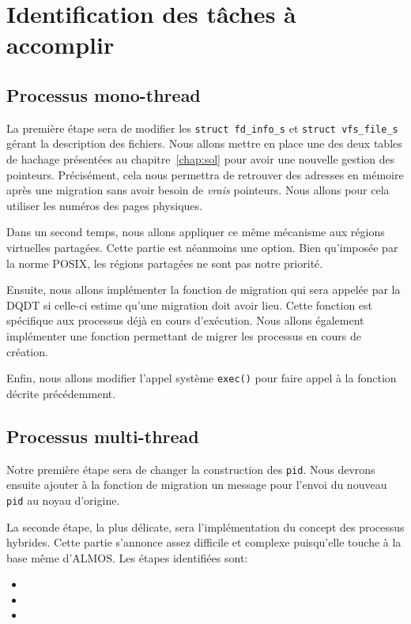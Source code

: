 \chapter{Identification des tâches à accomplir}
\label{chap:tasks}

  \section{Processus mono-thread}

    La première étape sera de modifier les \texttt{struct fd\_info\_s} et
    \texttt{struct vfs\_file\_s} gérant la description des fichiers. Nous allons
    mettre en place une des deux tables de hachage présentées au
    chapitre~\ref{chap:sol} pour avoir une nouvelle gestion des
    pointeurs. Précisément, cela nous permettra de retrouver des adresses en
    mémoire après une migration sans avoir besoin de \textit{vrais}
    pointeurs. Nous allons pour cela utiliser les numéros des pages physiques.

    Dans un second temps, nous allons appliquer ce même mécanisme aux régions
    virtuelles partagées. Cette partie est néanmoins une option. Bien qu'imposée
    par la norme POSIX, les régions partagées ne sont pas notre priorité.

    Ensuite, nous allons implémenter la fonction de migration qui sera appelée
    par la DQDT si celle-ci estime qu'une migration doit avoir lieu. Cette
    fonction est spécifique aux processus déjà en cours d'exécution. Nous allons
    également implémenter une fonction permettant de migrer les processus en
    cours de création.
    
    Enfin, nous allons modifier l'appel système \texttt{exec()} pour faire appel
    à la fonction décrite précédemment.
    
  \section{Processus multi-thread}

    Notre première étape sera de changer la construction des \texttt{pid}. Nous
    devrons ensuite ajouter à la fonction de migration un message pour l'envoi
    du nouveau \texttt{pid} au noyau d'origine.

    La seconde étape, la plus délicate, sera l'implémentation du concept des
    processus hybrides. Cette partie s'annonce assez difficile et complexe
    puisqu'elle touche à la base même d'ALMOS. Les étapes identifiées sont:
    \begin{itemize}
      \item \todo{}
      \item \todo{}
      \item \todo{}
    \end{itemize}
  
